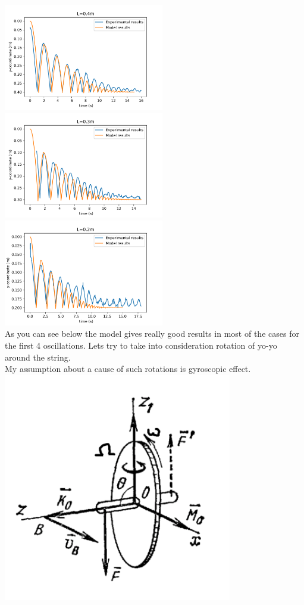\documentclass[a4paper,11pt,oneside,article]{memoir}
\begin{document}
\includegraphics[width=7cm]{images/pic10.png}
\includegraphics[width=7cm]{images/pic11.png}\\
\includegraphics[width=7cm]{images/pic12.png}\\
As you can see below the model gives really good results in most of the cases for the first 4 oscillations.
Lets try to take into consideration rotation of yo-yo around the string. \\
My assumption about a cause of such rotations is gyroscopic effect.\\
\includegraphics[width=10cm]{images/pic13.png}\\
\end{document}
